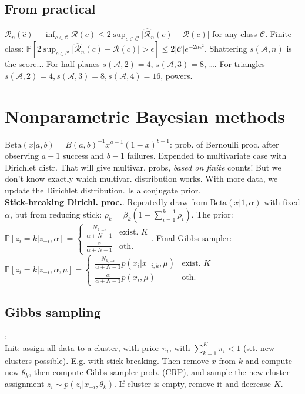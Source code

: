 \subsection*{From practical}
$\mathcal{R}_n(\hat{c})-\inf_{c\in\mathcal{C}}\mathcal{R}(c) \leq 2\sup_{c\in\mathcal{C}}\lvert \hat{\mathcal{R}}_n(c) - \mathcal{R}(c) \rvert$ for any class $\mathcal{C}$. Finite class:
$\mathbb{P}[2\sup_{c\in\mathcal{C}}\lvert \hat{\mathcal{R}}_n(c) - \mathcal{R}(c) \rvert>\epsilon]\leq 2\lvert\mathcal{C}\rvert e^{-2n\epsilon^2}$.
Shattering $s(\mathcal{A},n)$ is the score... For half-planes $s(\mathcal{A},2)=4$, $s(\mathcal{A},3)=8$, \dots. For triangles $s(\mathcal{A},2)=4,s(\mathcal{A},3)=8,s(\mathcal{A},4)=16$, powers.

\section*{Nonparametric Bayesian methods}
$\text{Beta}(x|a,b)=B(a,b)^{-1} x^{a-1}(1-x)^{b-1}$: prob. of Bernoulli proc. after observing $a-1$ success and $b-1$ failures. Expended to multivariate case with Dirichlet distr. That will give multivar. probs, \textit{based on finite} counts! But we don't know exactly which multivar. distribution works. With more data, we update the Dirichlet distribution. Is a conjugate prior.\\
\textbf{Stick-breaking Dirichl. proc.}. Repeatedly draw from $\text{Beta}(x|1,\alpha)$ with fixed $\alpha$, but from reducing stick: $\rho_k=\beta_k(1-\sum_{i=1}^{k-1}\rho_i)$. The prior:\\
$\mathbb{P}[z_i=k|z_{-i},\alpha]=\begin{cases}\frac{N_{k,-i}}{\alpha+N-1} & \text{exist. }K \\ \frac{\alpha}{\alpha+N-1} & \text{oth.}\end{cases}$. Final Gibbs sampler:\\
$\mathbb{P}[z_i=k|z_{-i},\alpha,\mu]=\begin{cases}\frac{N_{k,-i}}{\alpha+N-1}p(x_i|x_{-i,k},\mu) & \text{exist. }K \\ \frac{\alpha}{\alpha+N-1}p(x_i,\mu) & \text{oth.}\end{cases}$

\subsection*{Gibbs sampling}:\\
Init: assign all data to a cluster, with prior $\pi_i$, with $\sum_{k=1}^K\pi_i<1$ (s.t. new clusters possible). E.g. with stick-breaking. Then remove $x$ from $k$ and compute new $\theta_k$, then compute Gibbs sampler prob. (CRP), and sample the new cluster assignment $z_i\sim p(z_i|x_{-i},\theta_k)$. If cluster is empty, remove it and decrease $K$.